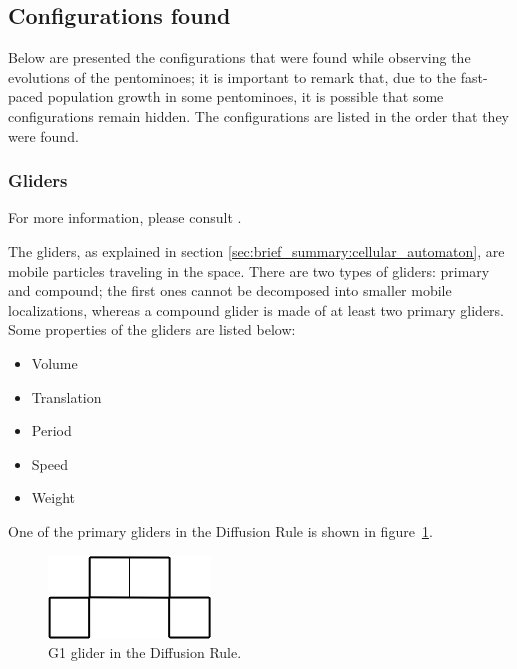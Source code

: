 
\newpage
\subsection{Configurations found}
\label{sec:configurations-found}
Below are presented the configurations that were found while observing the
evolutions of the pentominoes; it is important to remark that, due to the
fast-paced population growth in some pentominoes, it is possible that some
configurations remain hidden. The configurations are listed in the order that
they were found.

\subsubsection{Gliders}

For more information, please consult \cite{j2}.

The gliders, as explained in section \ref{sec:brief_summary:cellular_automaton},
are mobile particles traveling in the space. There are two types of gliders:
primary and compound; the first ones cannot be decomposed into smaller mobile
localizations, whereas a compound glider is made of at least two primary
gliders. Some properties of the gliders are listed below:
\begin{itemize}
  \item Volume
  \item Translation
  \item Period
  \item Speed
  \item Weight
\end{itemize}

One of the primary gliders in the Diffusion Rule is shown in
figure~\ref{fig:dr-glider-1}.

\begin{figure}[H]
	\centering
	\includegraphics[scale=0.532]{df_settings_dd/dr-glider-1.png}
	\caption{G1 glider in the Diffusion Rule.}
  \label{fig:dr-glider-1}
\end{figure}

